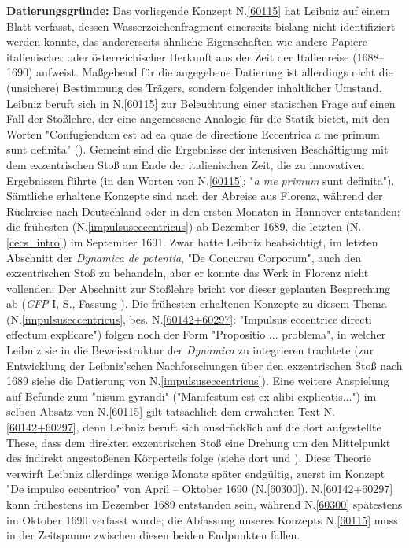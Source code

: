 \begin{ledgroup}
\footnotesize
\pstart
\noindent
\textbf{Datierungsgründe:}
Das vorliegende Konzept N.\;\ref{60115} hat Leibniz auf einem Blatt verfasst, dessen Wasserzeichenfragment einerseits bislang nicht identifiziert werden konnte, das andererseits ähnliche Eigenschaften wie andere Papiere italienischer oder österreichischer Herkunft aus der Zeit der Italienreise (1688--1690) aufweist.
Maßgebend für die angegebene Datierung ist allerdings nicht die (unsichere) Bestimmung des Trägers, sondern folgender inhaltlicher Umstand.
\pend
\pstart
Leibniz beruft sich in N.\;\ref{60115} zur Beleuchtung einer statischen Frage auf einen Fall der Stoßlehre, der eine angemessene Analogie für die Statik bietet, mit den Worten
"Confugiendum est ad ea quae de directione Eccentrica a me primum sunt definita" ().
Gemeint sind die Ergebnisse der intensiven Beschäftigung mit dem exzentrischen Stoß am Ende der italienischen Zeit, die zu innovativen Ergebnissen führte (in den Worten von N.\;\ref{60115}: "\textit{a me primum} sunt definita").
Sämtliche erhaltene Konzepte sind nach der Abreise aus Florenz, während der Rückreise nach Deutschland oder in den ersten Monaten in Hannover entstanden:
die frühesten (N.\;\ref{impulsuseccentricus}) ab Dezember 1689,
die letzten (N.\;\ref{cecs_intro}) im September 1691.
Zwar hatte Leibniz beabsichtigt, im letzten Abschnitt der \cite{01354}\textit{Dynamica de potentia}, "De Concursu Corporum", auch den exzentrischen Stoß zu behandeln, aber er konnte das Werk in Florenz nicht vollenden: Der Abschnitt zur Stoßlehre bricht vor dieser geplanten Besprechung ab
(\textit{CFP} I, S., Fassung ).
\pend
\pstart
Die frühesten erhaltenen Konzepte zu diesem Thema (N.\;\ref{impulsuseccentricus}, bes. N.\;\ref{60142+60297}: "Impulsus eccentrice directi effectum explicare") folgen noch der Form "Propositio ... problema", in welcher Leibniz sie in die Beweisstruktur der \textit{Dynamica} zu integrieren trachtete (zur Entwicklung der Leibniz'schen Nachforschungen über den exzentrischen Stoß nach 1689 siehe die Datierung von N.\;\ref{impulsuseccentricus}).
Eine weitere Anspielung auf Befunde zum "nisum gyrandi" ("Manifestum est ex alibi explicatis...") im selben Absatz von N.\;\ref{60115} gilt tatsächlich dem erwähnten Text N.\;\ref{60142+60297}, denn Leibniz beruft sich ausdrücklich auf die dort aufgestellte These, dass dem direkten exzentrischen Stoß eine Drehung um den Mittelpunkt des indirekt angestoßenen Körperteils folge (siehe dort  und ).
Diese Theorie verwirft Leibniz allerdings wenige Monate später endgültig, zuerst im Konzept "De impulso eccentrico" von April -- Oktober 1690 (N.\;\ref{60300}).
N.\;\ref{60142+60297} kann frühestens im Dezember 1689 entstanden sein, während  N.\;\ref{60300} spätestens im Oktober 1690 verfasst wurde; die Abfassung unseres Konzepts N.\;\ref{60115} muss in der Zeitspanne zwischen diesen beiden Endpunkten fallen.
\pend 
\end{ledgroup}

